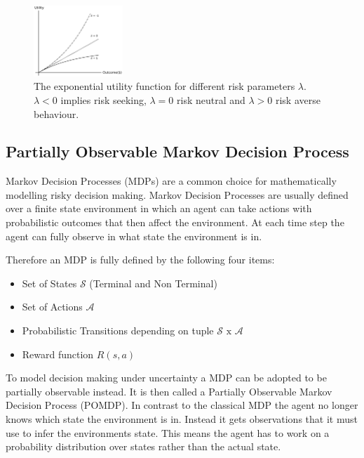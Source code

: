\begin{figure}[ht]
\centering
\includegraphics[width=0.3\textwidth]{img/background/Exponential_Utility_Function.pdf}%
\caption{ 
The exponential utility function for different risk parameters $\lambda$. $\lambda < 0$ implies risk seeking, $\lambda = 0 $ risk neutral and $\lambda > 0 $ risk averse behaviour.
}
\label{fig:background:exponential}
\end{figure}





\subsection{Partially Observable Markov Decision Process}

Markov Decision Processes (MDPs) are a common choice for mathematically modelling risky decision making. Markov Decision Processes are usually defined over a finite state environment in which an agent can take actions with probabilistic outcomes that then affect the environment. At each time step the agent can fully observe in what state the environment is in.

Therefore an MDP is fully defined by the following four items:
\begin{itemize}
    \item Set of States $\mathcal{S}$ (Terminal and Non Terminal)
    \item Set of Actions $\mathcal{A}$
    \item Probabilistic Transitions depending on tuple $\mathcal{S}\text{ x } \mathcal{A}$
    \item Reward function $R(s,a)$
\end{itemize}

To model decision making under uncertainty a MDP can be adopted to be partially observable instead. It is then called a Partially Observable Markov Decision Process (POMDP). In contrast to the classical MDP the agent no longer knows which state the environment is in. Instead it gets observations that it must use to infer the environments state.
This means the agent has to work on a probability distribution over states rather than the actual state.

